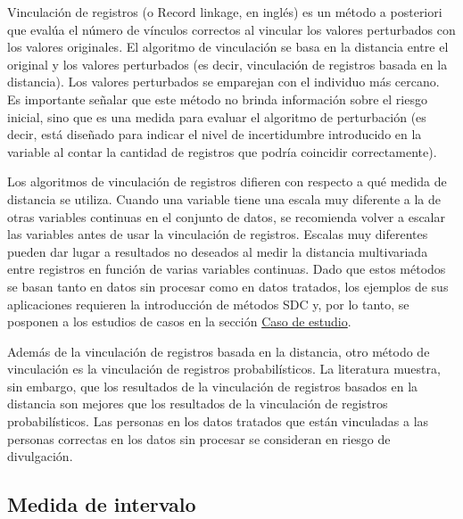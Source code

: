\documentclass[]{book}
\theoremstyle{definition}
\theoremstyle{definition}
\theoremstyle{definition}
\theoremstyle{definition}
\theoremstyle{remark}
\begin{document}
Vinculación de registros (o Record linkage, en inglés) es un método a posteriori que evalúa el número de vínculos correctos al vincular los valores perturbados con los valores originales. El algoritmo de vinculación se basa en la distancia entre el original y los valores perturbados (es decir, vinculación de registros basada en la distancia). Los valores perturbados se emparejan con el individuo más cercano. Es importante señalar que este método no brinda información sobre el riesgo inicial, sino que es una medida para evaluar el algoritmo de perturbación (es decir, está diseñado para indicar el nivel de incertidumbre introducido en la variable al contar la cantidad de registros que podría coincidir correctamente).

Los algoritmos de vinculación de registros difieren con respecto a qué medida de distancia se utiliza. Cuando una variable tiene una escala muy diferente a la de otras variables continuas en el conjunto de datos, se recomienda volver a escalar las variables antes de usar la vinculación de registros. Escalas muy diferentes pueden dar lugar a resultados no deseados al medir la distancia multivariada entre registros en función de varias variables continuas. Dado que estos métodos se basan tanto en datos sin procesar como en datos tratados, los ejemplos de sus aplicaciones requieren la introducción de métodos SDC y, por lo tanto, se posponen a los estudios de casos en la sección \protect\hyperlink{caso-de-estudio}{Caso de estudio}.

Además de la vinculación de registros basada en la distancia, otro método de vinculación es la vinculación de registros probabilísticos. La literatura muestra, sin embargo, que los resultados de la vinculación de registros basados en la distancia son mejores que los resultados de la vinculación de registros probabilísticos. Las personas en los datos tratados que están vinculadas a las personas correctas en los datos sin procesar se consideran en riesgo de divulgación.

\hypertarget{medida-de-intervalo}{%
\subsection{Medida de intervalo}\label{medida-de-intervalo}}
\end{document}

